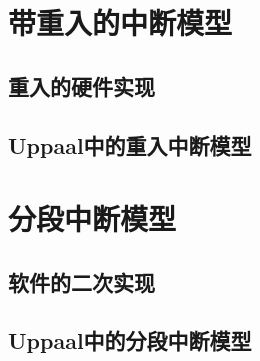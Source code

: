 \section{带重入的中断模型}
\label{sec:reentrant}

\subsection{重入的硬件实现}
\label{subsec:reentrant_hardware}

\subsection{Uppaal中的重入中断模型}
\label{subsec:reentrant_uppaal}

\section{分段中断模型}
\label{sec:segment}

\subsection{软件的二次实现}
\label{subsec:segment_software}

\subsection{Uppaal中的分段中断模型}
\label{subsec:segment_uppaal}